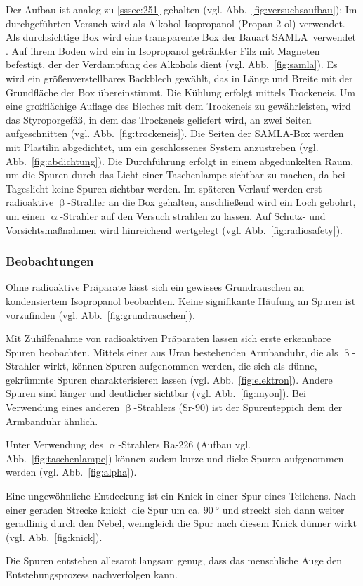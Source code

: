 \documentclass[a4paper,12pt]{article}
\newcommand{\figref}[1]{Abb.~\ref{#1}}
\begin{document}
Der Aufbau ist analog zu \cref{sssec:251} gehalten (vgl. \figref{fig:versuchsaufbau}): Im durchgeführten Versuch wird als Alkohol Isopropanol (Propan-2-ol) verwendet. Als durchsichtige Box wird eine transparente Box der Bauart \glqq SAMLA\grqq \ verwendet \cite{IDGK}. Auf ihrem Boden wird ein in Isopropanol getränkter Filz mit Magneten befestigt, der der Verdampfung des Alkohols dient (vgl. \figref{fig:samla}). Es wird ein größenverstellbares Backblech gewählt, das in Länge und Breite mit der Grundfläche der Box übereinstimmt. Die Kühlung erfolgt mittels Trockeneis. Um eine großflächige Auflage des Bleches mit dem Trockeneis zu gewährleisten, wird das Styroporgefäß, in dem das Trockeneis geliefert wird, an zwei Seiten aufgeschnitten (vgl. \figref{fig:trockeneis}). Die Seiten der SAMLA-Box werden mit Plastilin abgedichtet, um ein geschlossenes System anzustreben (vgl. \figref{fig:abdichtung}). Die Durchführung erfolgt in einem abgedunkelten Raum, um die Spuren durch das Licht einer Taschenlampe sichtbar zu machen, da bei Tageslicht keine Spuren sichtbar werden. Im späteren Verlauf werden erst radioaktive $\upbeta$-Strahler an die Box gehalten, anschließend wird ein Loch gebohrt, um einen $\upalpha$-Strahler auf den Versuch strahlen zu lassen. Auf Schutz- und Vorsichtsmaßnahmen wird hinreichend wertgelegt (vgl. \figref{fig:radiosafety}).



\subsubsection{Beobachtungen} \label{sssec:253}

Ohne radioaktive Präparate lässt sich ein gewisses Grundrauschen an kondensiertem Isopropanol beobachten. Keine signifikante Häufung an Spuren ist vorzufinden (vgl. \figref{fig:grundrauschen}). \par
Mit Zuhilfenahme von radioaktiven Präparaten lassen sich erste erkennbare Spuren beobachten. Mittels einer aus Uran bestehenden Armbanduhr, die als $\upbeta$-Strahler wirkt, können Spuren aufgenommen werden, die sich als dünne, gekrümmte Spuren charakterisieren lassen (vgl. \figref{fig:elektron}). Andere Spuren sind länger und deutlicher sichtbar (vgl. \figref{fig:myon}). Bei Verwendung eines anderen $\upbeta$-Strahlers (Sr-90) ist der Spurenteppich dem der Armbanduhr ähnlich. \par
Unter Verwendung des $\upalpha$-Strahlers Ra-226 (Aufbau vgl. \figref{fig:taschenlampe}) können zudem kurze und dicke Spuren aufgenommen werden (vgl. \figref{fig:alpha}). \par
Eine ungewöhnliche Entdeckung ist ein Knick in einer Spur eines Teilchens. Nach einer geraden Strecke \glqq knickt\grqq \ die Spur um ca. $\qty{90}{\degree}$ und streckt sich dann weiter geradlinig durch den Nebel, wenngleich die Spur nach diesem Knick dünner wirkt (vgl. \figref{fig:knick}). \par
Die Spuren entstehen allesamt langsam genug, dass das menschliche Auge den Entstehungsprozess nachverfolgen kann. 
\end{document}
